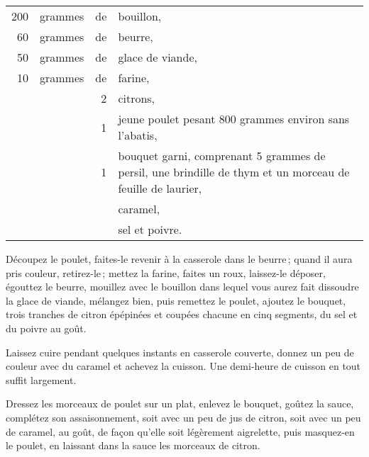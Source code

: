\footnotesize
\begin{longtable}{rrrp{16em}}
    200 & grammes & de & bouillon,                                                                        \\
     60 & grammes & de & beurre,                                                                          \\
     50 & grammes & de & glace de viande,                                                                 \\
     10 & grammes & de & farine,                                                                          \\
        &         &  2 & citrons,                                                                         \\
        &         &  1 & jeune poulet pesant 800 grammes environ sans l'abatis,                           \\
        &         &  1 & bouquet garni, comprenant 5 grammes de persil, une
                         brindille de thym et un morceau de feuille de laurier,                           \\
        &         &    & caramel,                                                                         \\
        &         &    & sel et poivre.                                                                   \\
\end{longtable}
\normalsize

Découpez le poulet, faites-le revenir à la casserole dans le beurre ; quand il
aura pris couleur, retirez-le ; mettez la farine, faites un roux, laissez-le
déposer, égouttez le beurre, mouillez avec le bouillon dans lequel vous aurez
fait dissoudre la glace de viande, mélangez bien, puis remettez le poulet,
ajoutez le bouquet, trois tranches de citron épépinées et coupées chacune en
cinq segments, du sel et du poivre au goût.

Laissez cuire pendant quelques instants en casserole couverte, donnez un peu
de couleur avec du caramel et achevez la cuisson. Une demi-heure de cuisson en
tout suffit largement.

Dressez les morceaux de poulet sur un plat, enlevez le bouquet, goûtez la
sauce, complétez son assaisonnement, soit avec un peu de jus de citron, soit
avec un peu de caramel, au goût, de façon qu'elle soit légèrement aigrelette,
puis masquez-en le poulet, en laissant dans la sauce les morceaux de citron.

